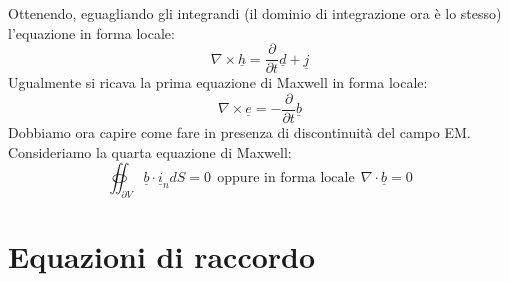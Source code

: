 \documentclass{book}
\begin{document}
        Ottenendo, eguagliando gli integrandi (il dominio di integrazione ora è lo stesso) l'equazione in forma locale:
        \begin{equation}
            \nabla \times \underline{h} = \frac{\partial}{\partial t} \underline{d} + \underline{j}
        \end{equation}
        Ugualmente si ricava la prima equazione di Maxwell in forma locale:
        \begin{equation}
            \nabla \times \underline{e} = - \frac{\partial}{\partial t} \underline{b}
        \end{equation}
        Dobbiamo ora capire come fare in presenza di discontinuità del campo EM. Consideriamo la quarta equazione di Maxwell:
        \begin{equation}
            \oiint_{\partial V} \underline{b} \cdot \underline{i}_{n} dS =0 \ \ \textrm{oppure in forma locale} \ \ \nabla \cdot \underline{b} = 0
        \end{equation} \newpage
        \section{Equazioni di raccordo}
\end{document}
